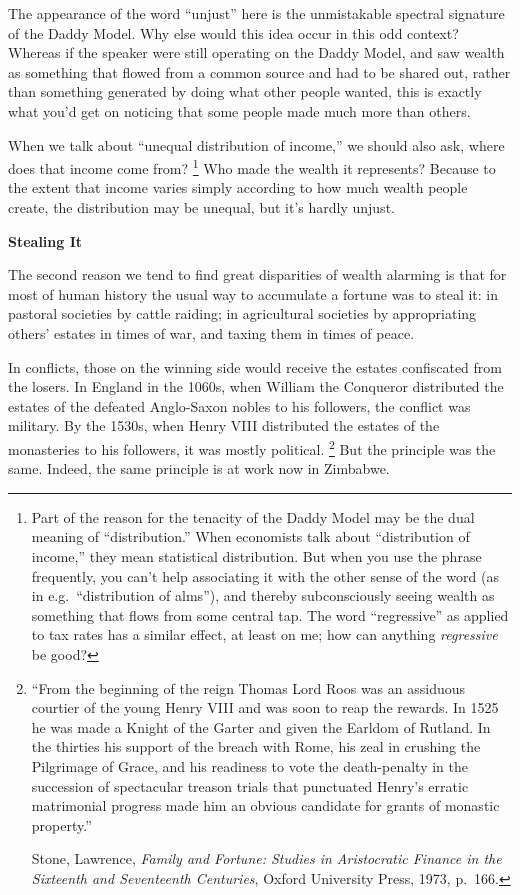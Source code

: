The appearance of the word ``unjust'' here is the unmistakable spectral
signature of the Daddy Model. Why else would this idea occur in this odd
context? Whereas if the speaker were still operating on the Daddy Model,
and saw wealth as something that flowed from a common source and had to
be shared out, rather than something generated by doing what other
people wanted, this is exactly what you'd get on noticing that some
people made much more than others.

When we talk about ``unequal distribution of income,'' we should also
ask, where does that income come from? \footnote{Part of the reason for the tenacity of the Daddy Model may be
the dual meaning of ``distribution.'' When economists talk about
``distribution of income,'' they mean statistical distribution. But when
you use the phrase frequently, you can't help associating it with the
other sense of the word (as in e.g.~``distribution of alms''), and
thereby subconsciously seeing wealth as something that flows from some
central tap. The word ``regressive'' as applied to tax rates has a
similar effect, at least on me; how can anything \emph{regressive} be
good?} Who made
the wealth it represents? Because to the extent that income varies
simply according to how much wealth people create, the distribution may
be unequal, but it's hardly unjust.

\textbf{Stealing It}

The second reason we tend to find great disparities of wealth alarming
is that for most of human history the usual way to accumulate a fortune
was to steal it: in pastoral societies by cattle raiding; in
agricultural societies by appropriating others' estates in times of war,
and taxing them in times of peace.

In conflicts, those on the winning side would receive the estates
confiscated from the losers. In England in the 1060s, when William the
Conqueror distributed the estates of the defeated Anglo-Saxon nobles to
his followers, the conflict was military. By the 1530s, when Henry VIII
distributed the estates of the monasteries to his followers, it was
mostly political. \footnote{``From the beginning of the reign Thomas Lord Roos was an
assiduous courtier of the young Henry VIII and was soon to reap the
rewards. In 1525 he was made a Knight of the Garter and given the
Earldom of Rutland. In the thirties his support of the breach with Rome,
his zeal in crushing the Pilgrimage of Grace, and his readiness to vote
the death-penalty in the succession of spectacular treason trials that
punctuated Henry's erratic matrimonial progress made him an obvious
candidate for grants of monastic property.''

Stone, Lawrence, \emph{Family and Fortune: Studies in Aristocratic
Finance in the Sixteenth and Seventeenth Centuries}, Oxford University
Press, 1973, p.~166.} But the principle was the
same. Indeed, the same principle is at work now in Zimbabwe.

